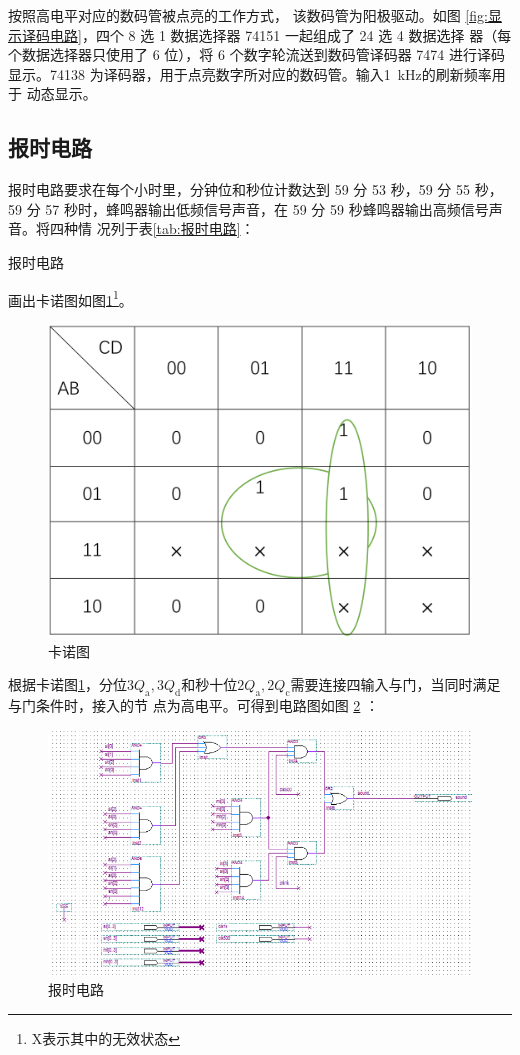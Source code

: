 \documentclass[twoside, openright]{article}
\begin{document}
按照高电平对应的数码管被点亮的工作方式， 该数码管为阳极驱动。如图
\ref{fig:显示译码电路}，四个 8 选 1 数据选择器 74151 一起组成了 24 选 4 数据选择
器（每个数据选择器只使用了 6 位），将 6 个数字轮流送到数码管译码器 7474 进行译码
显示。74138 为译码器，用于点亮数字所对应的数码管。输入\SI{1}{\kHz}的刷新频率用于
动态显示。

\subsection{报时电路}%
\label{sub:报时电路}

报时电路要求在每个小时里，分钟位和秒位计数达到 59 分 53 秒，59 分 55 秒，59 分
57 秒时，蜂鸣器输出低频信号声音，在 59 分 59 秒蜂鸣器输出高频信号声音。将四种情
况列于表\ref{tab:报时电路}：

\begin{table}[htbp]
	\centering
	\caption{报时电路}
	\label{tab:报时电路}
\end{table}

画出卡诺图如图\ref{fig:卡诺图}\footnote{X表示其中的无效状态}。

\begin{figure}[htbp]
	\centering
	\includegraphics[width = 0.6\linewidth]{Karnaugh.png}
	\caption{卡诺图}
	\label{fig:卡诺图}
\end{figure}

根据卡诺图\ref{fig:卡诺图}，分位$ 3Q_\mathrm{a}, 3Q_\mathrm{d} $和秒十位$
2Q_\mathrm{a}, 2Q_\mathrm{c} $需要连接四输入与门，当同时满足与门条件时，接入的节
点为高电平。可得到电路图如图 \ref{fig:报时电路} ：

\begin{figure}[htbp]
	\centering
	\includegraphics[width = 0.7\linewidth]{give-time.png}
	\caption{报时电路}
	\label{fig:报时电路}
\end{figure}
\end{document}
